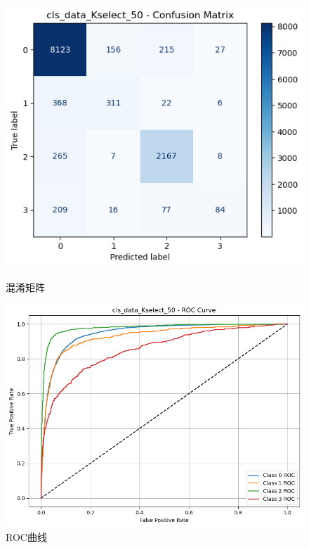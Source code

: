 \documentclass[10pt]{article}
\begin{document}
\begin{figure}[H]
\centering
\begin{minipage}[t]{0.45\textwidth}
  \centering
  \includegraphics[width=\linewidth]{cls_log_50s.png}
  \caption{混淆矩阵}
  \label{fig:39}
\end{minipage}
\hfill
\begin{minipage}[t]{0.52\textwidth}
  \centering
  \includegraphics[width=\linewidth]{cls_log_50s2.png}
  \caption{ROC曲线}
  \label{fig:40}
\end{minipage}
\end{figure}
\end{document}

